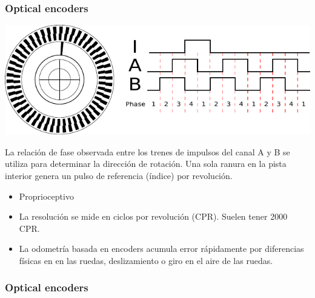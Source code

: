 \begin{frame}
    \frametitle{Optical encoders}

    \includegraphics[width=\columnwidth]{images/encoder.pdf}
    \footnotesize

    La relación de fase observada entre los trenes de impulsos del canal A y B se utiliza para determinar la dirección de rotación. Una sola ranura en la pista interior genera un pulso de referencia (índice) por revolución.

    \begin{itemize}
        \item Proprioceptivo
        \item La resolución se mide en ciclos por revolución (CPR). Suelen tener 2000 CPR.
        \item La odometría basada en encoders acumula error rápidamente por diferencias físicas en en las ruedas, deslizamiento o giro en el aire de las ruedas.
    \end{itemize}
\end{frame}

\begin{frame}
    \frametitle{Optical encoders}
    

\end{frame}

